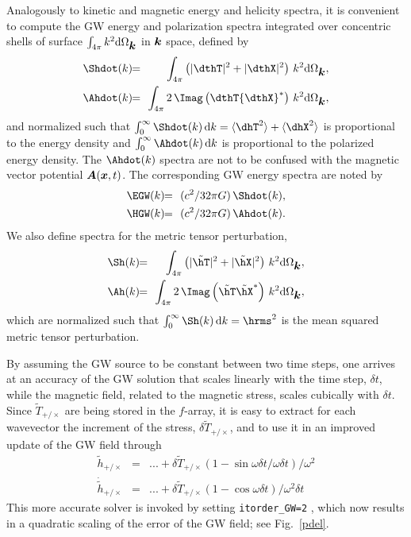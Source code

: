 \documentclass[\mydriver,12pt,twoside,notitlepage,a4paper]{article}
\makeatletter
\newcommand{\code}[1]{\texttt{#1}}
\newcommand{\cmd}{\command}
\newcommand{\command}[2][]{%
  \def\index@{#1}%
  \code{#2}%
  \ifx\index@\@empty\index{#2@\emph{#2}}%
  \else\index{#1@\emph{#1}}%
  \fi%
}
\renewcommand{\vec}[1]{\mbox{\boldmath{$#1$}}}
\newcommand{\Av}            {\vec{A}}
\newcommand{\kv}            {\vec{k}}
\newcommand{\xv}            {\vec{x}}
\newcommand{\bra}[1]{\langle #1\rangle}
\newcommand{\dd}{{\rm d} {}}
\makeatother
\begin{document}
Analogously to kinetic and magnetic energy and helicity spectra, it is
convenient to compute the GW energy and polarization spectra integrated
over concentric shells of surface $\int_{4\pi}k^2\dd\Omega_{\kv}$ in $\kv$
space, defined by
\begin{eqnarray}
\Shdot(k)\!\!&=&\!\!\int_{4\pi}\left(|\dthT|^2+|\dthX|^2\right)\,k^2\dd\Omega_{\kv},\\
\Ahdot(k)\!\!&=&\!\!\int_{4\pi}2\,\Imag\left(\dthT{{\dthX}}^\ast\right)\,k^2\dd\Omega_{\kv},
\end{eqnarray}
and normalized such that $\int_0^\infty\Shdot(k)\,\dd k=\bra{\dhT^2}+\bra{\dhX^2}$
is proportional to the energy density and $\int_0^\infty \Ahdot(k)\,\dd k$
is proportional to the polarized energy density.
The $\Ahdot(k)$ spectra are not to be confused with the magnetic vector
potential $\Av(\xv,t)$.
The corresponding GW energy spectra are noted by
\begin{eqnarray}
\EGW(k)\!\!&=&\!\!(c^2/32\pi G)\,\Shdot(k),\\
\HGW(k)\!\!&=&\!\!(c^2/32\pi G)\,\Ahdot(k).
\end{eqnarray}
We also define spectra for the metric tensor perturbation,
\begin{eqnarray}
\Sh(k)\!\!&=&\!\!\int_{4\pi}\left(|\tilde\hT|^2+|\tilde\hX|^2\right)\,k^2\dd\Omega_{\kv},\\
\Ah(k)\!\!&=&\!\!\int_{4\pi}2\,\Imag\left(\tilde\hT\tilde\hX^\ast\right)\,k^2\dd\Omega_{\kv},
\end{eqnarray}
which are normalized such that $\int_0^\infty\Sh(k)\,\dd k=\hrms^2$ is the
mean squared metric tensor perturbation.

By assuming the GW source to be constant between two time steps, one
arrives at an accuracy of the GW solution that scales linearly with the
time step, $\delta t$, while the magnetic field, related to the magnetic
stress, scales cubically with $\delta t$.
Since $\tilde{T}_{+/\times}$ are being stored in the $f$-array, it is
easy to extract for each wavevector the increment of the stress,
$\delta\tilde{T}_{+/\times}$, and to use it in an improved update
of the GW field through
\begin{eqnarray}
\tilde{h}_{+/\times}\!\!&=&\!\!...+\delta\tilde{T}_{+/\times}\left(1-\sin\omega\delta t/\omega\delta t\right)/\omega^2\\
\dot\tilde{h}_{+/\times}\!\!&=&\!\!...+\delta\tilde{T}_{+/\times}\left(1-\cos\omega\delta t\right)/\omega^2\delta t
\end{eqnarray}
This more accurate solver is invoked by setting \cmd{itorder_GW=2},
which now results in a quadratic scaling of the error of the GW field;
see Fig.~\ref{pdel}.
\end{document}
